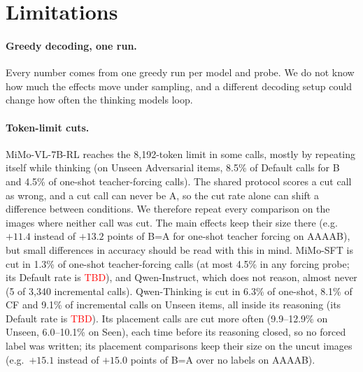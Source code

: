 \providecommand{\tbd}{\textcolor{red}{TBD}}

\section*{Limitations}

\paragraph{Greedy decoding, one run.} Every number comes from one greedy run per model and probe. We
do not know how much the effects move under sampling, and a different decoding setup could change
how often the thinking models loop.

\paragraph{Token-limit cuts.} MiMo-VL-7B-RL reaches the 8,192-token limit in some calls, mostly by
repeating itself while thinking (on Unseen Adversarial items, 8.5\% of Default calls for B and 4.5\%
of one-shot teacher-forcing calls). The shared protocol scores a cut call as wrong, and a cut call
can never be A, so the cut rate alone can shift a difference between conditions. We therefore repeat
every comparison on the images where neither call was cut. The main effects keep their size there
(e.g.\ $+11.4$ instead of $+13.2$ points of B=A for one-shot teacher forcing on AAAAB), but small
differences in accuracy should be read with this in mind. MiMo-SFT is cut in 1.3\% of one-shot
teacher-forcing calls (at most 4.5\% in any forcing probe; its Default rate is \tbd), and
Qwen-Instruct, which does not reason, almost never (5 of 3,340 incremental calls). Qwen-Thinking is
cut in 6.3\% of one-shot, 8.1\% of CF and 9.1\% of incremental calls on Unseen items, all
inside its reasoning (its Default rate is \tbd). Its placement calls are cut more often (9.9--12.9\%
on Unseen, 6.0--10.1\% on Seen), each time before its reasoning closed, so no forced label was
written; its placement comparisons keep their size on the uncut images (e.g.\ $+15.1$ instead of
$+15.0$ points of B=A over no labels on AAAAB).

